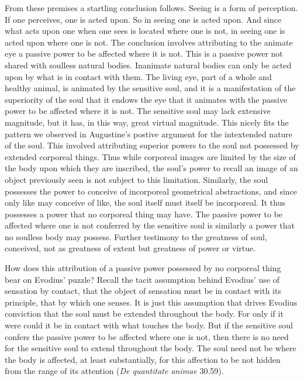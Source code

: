 \documentclass[12pt]{article}
\begin{document}
From these premises a startling conclusion follows. Seeing is a form of perception. If one perceives, one is acted upon. So in seeing one is acted upon. And since what acts upon one when one sees is located where one is not, in seeing one is acted upon where one is not. The conclusion involves attributing to the animate eye a passive power to be affected where it is not. This is a passive power not shared with soulless natural bodies. Inanimate natural bodies can only be acted upon by what is in contact with them. The living eye, part of a whole and healthy animal, is animated by the sensitive soul, and it is a manifestation of the superiority of the soul that it endows the eye that it animates with the passive power to be affected where it is not. The sensitive soul may lack extensive magnitude, but it has, in this way, great virtual magnitude. This nicely fits the pattern we observed in Augustine's postive argument for the intextended nature of the soul. This involved attributing superior powers to the soul not possessed by extended corporeal things. Thus while corporeal images are limited by the size of the body upon which they are inscribed, the soul's power to recall an image of an object previously seen is not subject to this limitation. Similarly, the soul possesses the power to conceive of incorporeal geometrical abstractions, and since only like may conceive of like, the soul itself must itself be incorporeal. It thus possesses a power that no corporeal thing may have. The passive power to be affected where one is not conferred by the sensitive soul is similarly a power that no soulless body may possess. Further testimony to the greatness of soul, conceived, not as greatness of extent but greatness of power or virtue.

How does this attribution of a passive power possessed by no corporeal thing bear on Evodius' puzzle? Recall the tacit assumption behind Evodius' use of sensation by contact, that the object of sensation must be in contact with its principle, that by which one senses. It is just this assumption that drives Evodius conviction that the soul must be extended throughout the body. For only if it were could it be in contact with what touches the body. But if the sensitive soul confers the passive power to be affected where one is not, then there is no need for the sensitive soul to extend throughout the body. The soul need not be where the body is affected, at least substantially, for this affection to be not hidden from the range of its attention (\emph{De quantitate animae} 30.59). 
\end{document}

